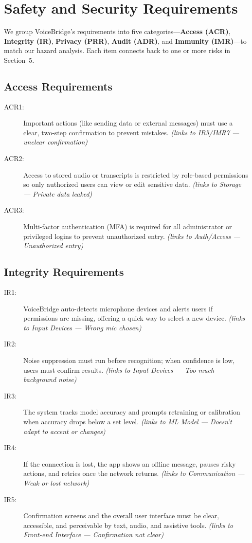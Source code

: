 \documentclass{article}
\begin{document}
\begin{table}[h!]
\end{table}





\section{Safety and Security Requirements}

We group VoiceBridge’s requirements into five categories—\textbf{Access (ACR)}, \textbf{Integrity (IR)}, \textbf{Privacy (PRR)}, \textbf{Audit (ADR)}, and \textbf{Immunity (IMR)}—to match our hazard analysis. Each item connects back to one or more risks in Section~5.

\subsection{Access Requirements}

\begin{description}
  \item[ACR1:] Important actions (like sending data or external messages) must use a clear, two-step confirmation to prevent mistakes. \emph{(links to IR5/IMR7 — unclear confirmation)}
  \item[ACR2:] Access to stored audio or transcripts is restricted by role-based permissions so only authorized users can view or edit sensitive data. \emph{(links to Storage — Private data leaked)}
  \item[ACR3:] Multi-factor authentication (MFA) is required for all administrator or privileged logins to prevent unauthorized entry. \emph{(links to Auth/Access — Unauthorized entry)}
\end{description}

\subsection{Integrity Requirements}

\begin{description}
  \item[IR1:] VoiceBridge auto-detects microphone devices and alerts users if permissions are missing, offering a quick way to select a new device. \emph{(links to Input Devices — Wrong mic chosen)}
  \item[IR2:] Noise suppression must run before recognition; when confidence is low, users must confirm results. \emph{(links to Input Devices — Too much background noise)}
  \item[IR3:] The system tracks model accuracy and prompts retraining or calibration when accuracy drops below a set level. \emph{(links to ML Model — Doesn’t adapt to accent or changes)}
  \item[IR4:] If the connection is lost, the app shows an offline message, pauses risky actions, and retries once the network returns. \emph{(links to Communication — Weak or lost network)}
  \item[IR5:] Confirmation screens and the overall user interface must be clear, accessible, and perceivable by text, audio, and assistive tools. \emph{(links to Front-end Interface — Confirmation not clear)}
\end{description}
\end{document}
